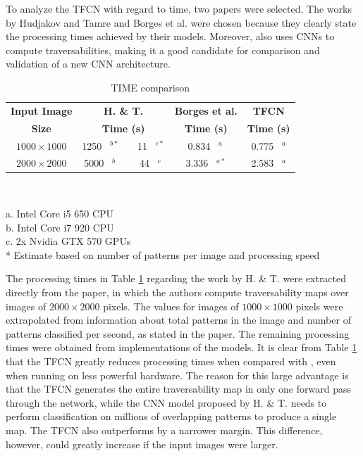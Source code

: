 \documentclass[conference]{IEEEtran}
\begin{document}
To analyze the TFCN with regard to time, two papers were selected.
The works by Hudjakov and Tamre \cite{hudjakov:2013} and Borges et al. \cite{borges:2019} were chosen because they clearly state the processing times achieved by their models.
Moreover, \cite{hudjakov:2013} also uses CNNs to compute traversabilities, making it a good candidate for comparison and validation of a new CNN architecture.

\begin{table}[htbp]
	\begin{center}
		\caption{TIME comparison}
		\begin{tabular}{|c|c c c|}
			\hline
			\textbf{Input Image} & \textbf{H. \& T. \cite{hudjakov:2013}} & \textbf{Borges et al.\cite{borges:2019}} & \textbf{TFCN} \\
			\textbf{Size} & \textbf{Time (s)} & \textbf{Time (s)} & \textbf{Time (s)} \\
			\hline
			$1000 \times 1000$ & 1250 \ $^{b*}$  \ \ \ 11 \ $^{c*}$ & 0.834 \ $^{a\ }$ & \cellcolor{blue!15} 0.775 \ $^{a}$ \\ %
			$2000 \times 2000$ & 5000 \ $^{b\phantom{*}}$  \ \ \ 44 \ $^{c\ }$ & 3.336 \ $^{a*}$ & \cellcolor{blue!15} 2.583 \ $^{a}$ \\ \hline
		\end{tabular} \\[0.01cm]
		\label{tab:comparison-time}
	\end{center}
	\hspace{0.2cm}
	\begin{minipage}[t]{\textwidth}
		\scriptsize{a. Intel Core i5 650 CPU} \\
		\scriptsize{b. Intel Core i7 920 CPU} \\
		\scriptsize{c. 2x Nvidia GTX 570 GPUs} \\
		\scriptsize{* Estimate based on number of patterns per image and processing speed}
	\end{minipage}
\vspace{-0.56cm}
\end{table}

The processing times in Table \ref{tab:comparison-time} regarding the work by H. \& T. were extracted directly from the paper, in which the authors compute traversability maps over images of $2000 \times 2000$ pixels.
The values for images of $1000 \times 1000$ pixels were extrapolated from information about total patterns in the image and number of patterns classified per second, as stated in the paper.
The remaining processing times were obtained from implementations of the models.
It is clear from Table \ref{tab:comparison-time} that the TFCN greatly reduces processing times when compared with \cite{hudjakov:2013}, even when running on less powerful hardware.
The reason for this large advantage is that the TFCN generates the entire traversability map in only one forward pass through the network, while the CNN model proposed by H. \& T. needs to perform classification on millions of overlapping patterns to produce a single map.
The TFCN also outperforms \cite{borges:2019} by a narrower margin.
This difference, however, could greatly increase if the input images were larger.
\end{document}
